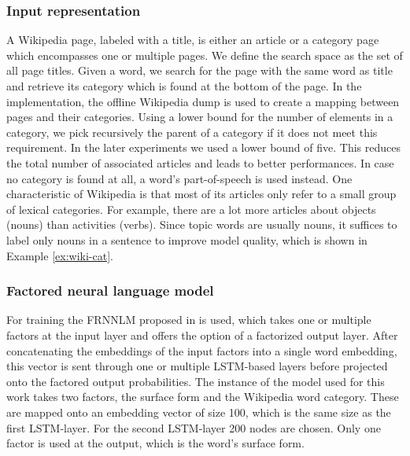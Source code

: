 \documentclass[a4paper]{article}
\begin{document}
\subsubsection{Input representation}
A Wikipedia page, labeled with a title, is either an article or a category page which encompasses one or multiple pages.
We define the search space as the set of all page titles. Given a word, we search for the page with the same word as title and retrieve its category which is found at the bottom of the page.
In the implementation, the offline Wikipedia dump is used to create a mapping between pages and their categories. Using a lower bound for the number of elements in a category, we pick recursively the parent of a category if it does not meet this requirement. In the later experiments we used a lower bound of five. This reduces the total number of associated articles and leads to better performances. In case no category is found at all, a word's part-of-speech is used instead.
One characteristic of Wikipedia is that most of its articles only refer to a small group of lexical categories. For example, there are a lot more articles about objects (nouns) than activities (verbs). Since topic words are usually nouns, it suffices to label only nouns in a sentence to improve model quality, which is shown in Example \ref{ex:wiki-cat}.

\subsubsection{Factored neural language model}
For training the FRNNLM proposed in \cite{niehuesusing} is used, which takes one or multiple factors at the input layer and offers the option of a factorized output layer. After concatenating the embeddings of the input factors into a single word embedding, this vector is sent through one or multiple LSTM-based layers \cite{hochreiter1997long} before projected onto the factored output probabilities. The instance of the model used for this work takes two factors, the surface form and the Wikipedia word category. These are mapped onto an embedding vector of size 100, which is the same size as the first LSTM-layer. For the second LSTM-layer 200 nodes are chosen. Only one factor is used at the output, which is the word's surface form.
\end{document}

